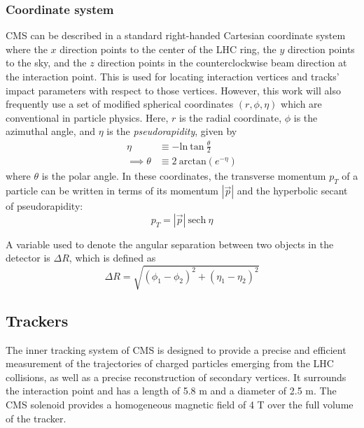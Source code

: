 \subsubsection{Coordinate system}
CMS can be described in a standard right-handed Cartesian coordinate system where 
the $x$ direction points to the center of the LHC ring, 
the $y$ direction points to the sky,
and the $z$ direction points in the counterclockwise beam direction at the interaction point.
This is used for locating interaction vertices and tracks' impact parameters with respect to those vertices.
However, this work will also frequently use a set of modified spherical coordinates $(r,\phi,\eta)$
which are conventional in particle physics.
Here, $r$ is the radial coordinate, $\phi$ is the azimuthal angle, and $\eta$ is the \textit{pseudorapidity}, given by
\begin{equation}
\begin{split}
\eta   & \equiv {-} \mathrm{ln}\:\mathrm{tan}\:\frac{\theta}{2} \\
\implies \theta & \equiv 2\:\mathrm{arctan} \left(e^{-\eta}\right)
\label{eq:eta}
\end{split}
\end{equation}
where $\theta$ is the polar angle. 
In these coordinates, the transverse momentum $p_T$ of a particle can be written in terms of its momentum $|\vec{p}|$ and the hyperbolic secant of pseudorapidity:
\begin{equation}
p_T = |\vec{p}|~\mathrm{sech}~\eta
\end{equation}

A variable used to denote the angular separation between two objects in the detector is $\Delta R$,
which is defined as
\begin{equation}
\Delta R = \sqrt{(\phi_1-\phi_2)^2 + (\eta_1-\eta_2)^2}
\end{equation}

\subsection{Trackers}

The inner tracking system of CMS is designed to provide a precise and efficient measurement
of the trajectories of charged particles emerging from the LHC collisions, as well as a precise
reconstruction of secondary vertices. It surrounds the interaction point and has a length of 5.8 m
and a diameter of 2.5 m. The CMS solenoid provides a homogeneous magnetic field of 4 T over
the full volume of the tracker.

